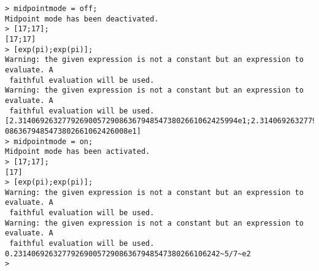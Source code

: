 \begin{center}\begin{minipage}{15cm}\begin{Verbatim}[frame=single]
> midpointmode = off;
Midpoint mode has been deactivated.
> [17;17];
[17;17]
> [exp(pi);exp(pi)];
Warning: the given expression is not a constant but an expression to evaluate. A
 faithful evaluation will be used.
Warning: the given expression is not a constant but an expression to evaluate. A
 faithful evaluation will be used.
[2.31406926327792690057290863679485473802661062425994e1;2.3140692632779269005729
0863679485473802661062426008e1]
> midpointmode = on;
Midpoint mode has been activated.
> [17;17];
[17]
> [exp(pi);exp(pi)];
Warning: the given expression is not a constant but an expression to evaluate. A
 faithful evaluation will be used.
Warning: the given expression is not a constant but an expression to evaluate. A
 faithful evaluation will be used.
0.23140692632779269005729086367948547380266106242~5/7~e2
> 
\end{Verbatim}
\end{minipage}\end{center}
